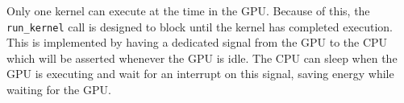 Only one kernel can execute at the time in the GPU.
Because of this, the \verb/run_kernel/ call is designed to block until the kernel has completed execution.
This is implemented by having a dedicated signal from the GPU to the CPU which will be asserted whenever the GPU is idle.
The CPU can sleep when the GPU is executing and wait for an interrupt on this signal, saving energy while waiting for the GPU.
